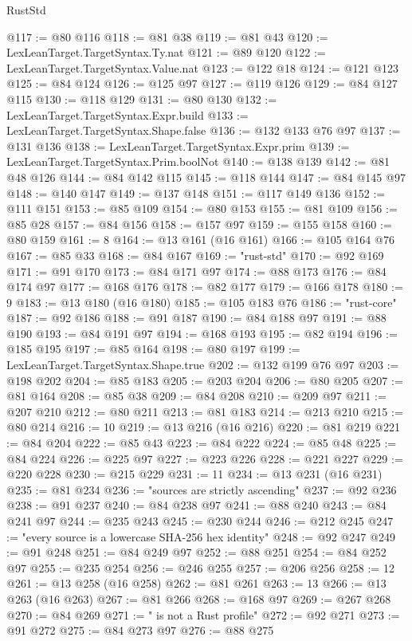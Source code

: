 \begin{lexlean}{RustStd}
\begin{coremodule}
{\begin{coremodule}
{{{{{{{{{{{{{{{{{{{{{{{{{{{{{{{{{{{{{{{{{{{{{{{{{{{{{@117 := @80 @116
@118 := @81 @38
@119 := @81 @43
@120 := LexLeanTarget.TargetSyntax.Ty.nat
@121 := @89 @120
@122 := LexLeanTarget.TargetSyntax.Value.nat
@123 := @122 @18
@124 := @121 @123
@125 := @84 @124
@126 := @125 @97
@127 := @119 @126
@129 := @84 @127 @115
@130 := @118 @129
@131 := @80 @130
@132 := LexLeanTarget.TargetSyntax.Expr.build
@133 := LexLeanTarget.TargetSyntax.Shape.false
@136 := @132 @133 @76 @97
@137 := @131 @136
@138 := LexLeanTarget.TargetSyntax.Expr.prim
@139 := LexLeanTarget.TargetSyntax.Prim.boolNot
@140 := @138 @139
@142 := @81 @48 @126
@144 := @84 @142 @115
@145 := @118 @144
@147 := @84 @145 @97
@148 := @140 @147
@149 := @137 @148
@151 := @117 @149 @136
@152 := @111 @151
@153 := @85 @109
@154 := @80 @153
@155 := @81 @109
@156 := @85 @28
@157 := @84 @156
@158 := @157 @97
@159 := @155 @158
@160 := @80 @159
@161 := 8
@164 := @13 @161 (@16 @161)
@166 := @105 @164 @76
@167 := @85 @33
@168 := @84 @167
@169 := "rust-std"
@170 := @92 @169
@171 := @91 @170
@173 := @84 @171 @97
@174 := @88 @173
@176 := @84 @174 @97
@177 := @168 @176
@178 := @82 @177
@179 := @166 @178
@180 := 9
@183 := @13 @180 (@16 @180)
@185 := @105 @183 @76
@186 := "rust-core"
@187 := @92 @186
@188 := @91 @187
@190 := @84 @188 @97
@191 := @88 @190
@193 := @84 @191 @97
@194 := @168 @193
@195 := @82 @194
@196 := @185 @195
@197 := @85 @164
@198 := @80 @197
@199 := LexLeanTarget.TargetSyntax.Shape.true
@202 := @132 @199 @76 @97
@203 := @198 @202
@204 := @85 @183
@205 := @203 @204
@206 := @80 @205
@207 := @81 @164
@208 := @85 @38
@209 := @84 @208
@210 := @209 @97
@211 := @207 @210
@212 := @80 @211
@213 := @81 @183
@214 := @213 @210
@215 := @80 @214
@216 := 10
@219 := @13 @216 (@16 @216)
@220 := @81 @219
@221 := @84 @204
@222 := @85 @43
@223 := @84 @222
@224 := @85 @48
@225 := @84 @224
@226 := @225 @97
@227 := @223 @226
@228 := @221 @227
@229 := @220 @228
@230 := @215 @229
@231 := 11
@234 := @13 @231 (@16 @231)
@235 := @81 @234
@236 := "sources are strictly ascending"
@237 := @92 @236
@238 := @91 @237
@240 := @84 @238 @97
@241 := @88 @240
@243 := @84 @241 @97
@244 := @235 @243
@245 := @230 @244
@246 := @212 @245
@247 := "every source is a lowercase SHA-256 hex identity"
@248 := @92 @247
@249 := @91 @248
@251 := @84 @249 @97
@252 := @88 @251
@254 := @84 @252 @97
@255 := @235 @254
@256 := @246 @255
@257 := @206 @256
@258 := 12
@261 := @13 @258 (@16 @258)
@262 := @81 @261
@263 := 13
@266 := @13 @263 (@16 @263)
@267 := @81 @266
@268 := @168 @97
@269 := @267 @268
@270 := @84 @269
@271 := " is not a Rust profile"
@272 := @92 @271
@273 := @91 @272
@275 := @84 @273 @97
@276 := @88 @275
}}}}}}}}}}}}}}}}}}}}}}}}}}}}}}}}}}}}}}}}}}}}}}}}}}}}}
\end{coremodule}}
\end{coremodule}
\end{lexlean}
